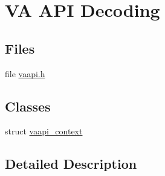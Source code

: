 \hypertarget{group__lavc__codec__hwaccel__vaapi}{}\section{VA A\+PI Decoding}
\label{group__lavc__codec__hwaccel__vaapi}
\subsection*{Files}
\begin{DoxyCompactItemize}
\item 
file \hyperlink{vaapi_8h}{vaapi.\+h}
\end{DoxyCompactItemize}
\subsection*{Classes}
\begin{DoxyCompactItemize}
\item 
struct \hyperlink{structvaapi__context}{vaapi\+\_\+context}
\end{DoxyCompactItemize}


\subsection{Detailed Description}
